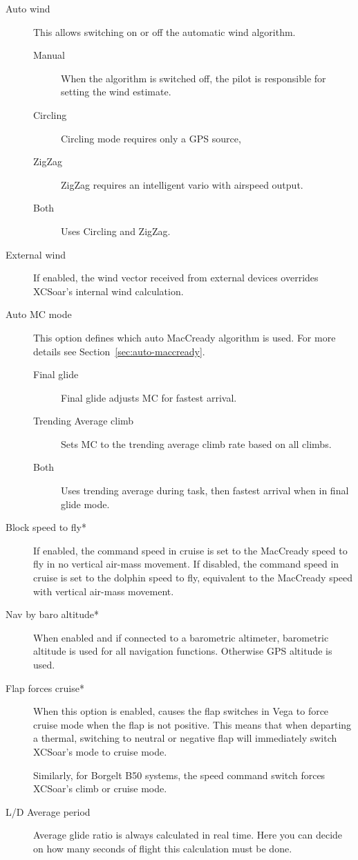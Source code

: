 \begin{description}
\item[Auto wind]  \label{conf:autowind} This allows switching on or off the
automatic wind algorithm.
 \begin{description}
\item[Manual]  When the algorithm is switched off, the pilot is responsible for
  setting the wind estimate.
\item[Circling]  Circling mode requires only a GPS source, 
\item[ZigZag]  ZigZag requires an intelligent vario with airspeed output.
\item[Both]  Uses Circling and ZigZag.
\end{description}

\item[External wind]  If enabled, the wind vector received from external
devices overrides XCSoar's internal wind calculation.

\item[Auto MC mode] This option defines which auto MacCready algorithm is used.
For more details see Section~\ref{sec:auto-maccready}.
 \begin{description}
\item[Final glide] Final glide adjusts MC for fastest arrival.
\item[Trending Average climb]  Sets MC to the trending average climb rate
based on all climbs.
\item[Both] Uses trending average during task, then fastest arrival when in
final glide mode.
\end{description}

\item[Block speed to fly*] If enabled, the command speed in cruise
  is set to the MacCready speed to fly in no vertical air-mass movement.
  If disabled, the command speed in cruise is set to the dolphin speed to fly,
  equivalent to the MacCready speed with vertical air-mass movement.

\item[Nav by baro altitude*] When enabled and if connected to a barometric
  altimeter, barometric altitude is used for all navigation functions. Otherwise
  GPS altitude is used.

\item[Flap forces cruise*]
  When this option is enabled, causes the flap switches in Vega to
  force cruise mode when the flap is not positive.  This means that
  when departing a thermal, switching to neutral or negative flap will
  immediately switch XCSoar's mode to cruise mode.

  Similarly, for Borgelt B50 systems, the speed command switch forces
  XCSoar's climb or cruise mode.

\item[L/D Average period] Average glide ratio is always calculated in real time. Here you can decide 
on how many seconds of flight this calculation must be done.
\end{description}

